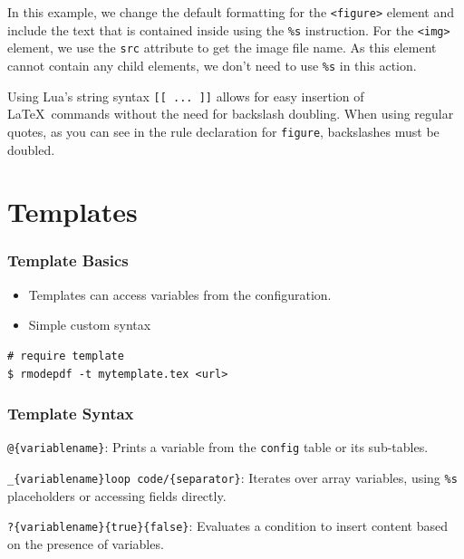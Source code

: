 In this example, we change the default formatting for the \verb|<figure>| element and include the 
text that is contained inside using the \verb|%s| instruction. For the \verb|<img>| element, we use 
the \verb|src| attribute to get the image file name. As this element cannot contain any child elements,
we don't need to use \verb|%s| in this action. 

Using Lua's string syntax \verb|[[ ... ]]| allows for easy insertion of \LaTeX\
commands without the need for backslash doubling. When using regular quotes, as
you can see in the rule declaration for \verb|figure|, backslashes must be
doubled.

\section{Templates}

\begin{frame}[fragile]
  \frametitle{Template Basics}

\begin{itemize}
  \item Templates can access variables from the configuration.
  \item Simple custom syntax
\end{itemize}

\begin{verbatim}
# require template
$ rmodepdf -t mytemplate.tex <url>
\end{verbatim}
\end{frame}



\begin{frame}[fragile]
\frametitle{Template Syntax}
\begin{description}
  \item[Variable Printing] \verb|@{variablename}|: Prints a variable from the \verb|config| table or its sub-tables.
  
  \item[Loops] \verb|_{variablename}loop code/{separator}|: Iterates over array variables, using \verb|%s| placeholders or accessing fields directly.
  
  \item[Conditions] \verb|?{variablename}{true}{false}|: Evaluates a condition to insert content based on the presence of variables.
\end{description}

\end{frame}

